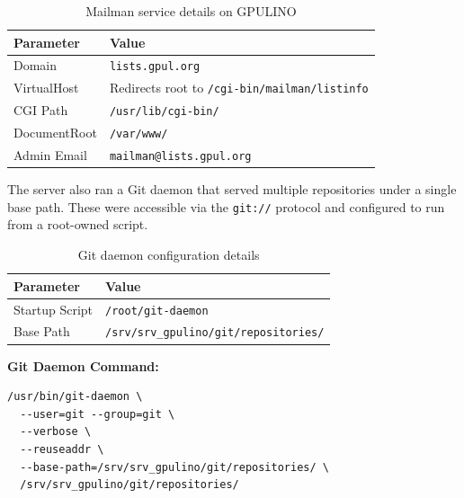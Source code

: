 \begin{table}[H]
  \centering
  \caption{Mailman service details on GPULINO}
  \label{tab:gpulino_mailman}
  \begin{tabular}{ll}
    \rowcolor{udcpink!25}
    \textbf{Parameter} & \textbf{Value} \\
    \hline
    Domain & \texttt{lists.gpul.org} \\
    VirtualHost & Redirects root to \texttt{/cgi-bin/mailman/listinfo} \\
    CGI Path & \texttt{/usr/lib/cgi-bin/} \\
    DocumentRoot & \texttt{/var/www/} \\
    Admin Email & \texttt{mailman@lists.gpul.org} \\
  \end{tabular}
\end{table}

The server also ran a Git daemon that served multiple repositories under a single base path. These were accessible via the \texttt{git://} protocol and configured to run from a root-owned script.

\begin{table}[H]
  \centering
  \caption{Git daemon configuration details}
  \label{tab:gpulino_git_daemon}
  \begin{tabular}{ll}
    \rowcolor{udcpink!25}
    \textbf{Parameter} & \textbf{Value} \\
    \hline
    Startup Script & \texttt{/root/git-daemon} \\
    Base Path & \verb|/srv/srv_gpulino/git/repositories/| \\
  \end{tabular}
\end{table}

\noindent
\textbf{Git Daemon Command:}
\begin{verbatim}
/usr/bin/git-daemon \
  --user=git --group=git \
  --verbose \
  --reuseaddr \
  --base-path=/srv/srv_gpulino/git/repositories/ \
  /srv/srv_gpulino/git/repositories/
\end{verbatim}

